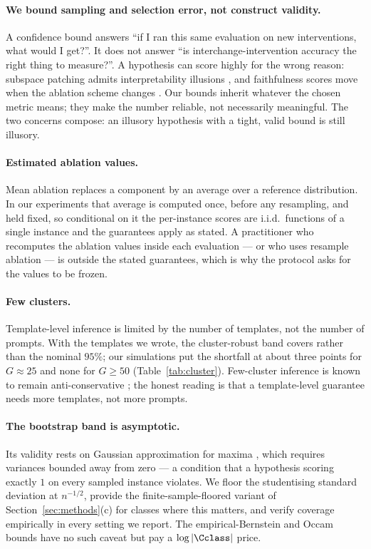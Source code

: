 \paragraph{We bound sampling and selection error, not construct validity.}
A confidence bound answers ``if I ran this same evaluation on new interventions,
what would I get?''. It does not answer ``is interchange-intervention accuracy
the right thing to measure?''. A hypothesis can score highly for the wrong
reason: subspace patching admits interpretability illusions
\citep{makelov2024subspace}, and faithfulness scores move when the ablation
scheme changes \citep{miller2024faithfulness,zhang2024bestpractices}. Our bounds
inherit whatever the chosen metric means; they make the number reliable, not
necessarily meaningful. The two concerns compose: an illusory hypothesis with a
tight, valid bound is still illusory.

\paragraph{Estimated ablation values.}
Mean ablation replaces a component by an average over a reference distribution.
In our experiments that average is computed once, before any resampling, and held
fixed, so conditional on it the per-instance scores are i.i.d.\ functions of a
single instance and the guarantees apply as stated. A practitioner who recomputes
the ablation values inside each evaluation --- or who uses resample ablation ---
is outside the stated guarantees, which is why the protocol asks for the values to
be frozen.

\paragraph{Few clusters.}
Template-level inference is limited by the number of templates, not the number of
prompts. With the \MyIOINTemplates{} templates we wrote, the cluster-robust band
covers \MyClusterClusterCov{} rather than the nominal $95\%$; our simulations put
the shortfall at about three points for $G\approx 25$ and none for $G\ge 50$
(Table~\ref{tab:cluster}). Few-cluster inference is known to remain
anti-conservative \citep{mnw2023clusterrobust}; the honest reading is that a
template-level guarantee needs more templates, not more prompts.

\paragraph{The bootstrap band is asymptotic.}
Its validity rests on Gaussian approximation for maxima
\citep{chernozhukov2013gaussian,cck2019moment}, which requires variances bounded
away from zero --- a condition that a hypothesis scoring exactly $1$ on every
sampled instance violates. We floor the studentising standard deviation at
$n^{-1/2}$, provide the finite-sample-floored variant of
Section~\ref{sec:methods}(c) for classes where this matters, and verify coverage
empirically in every setting we report. The empirical-Bernstein and Occam bounds
have no such caveat but pay a $\log|\Cclass|$ price.

